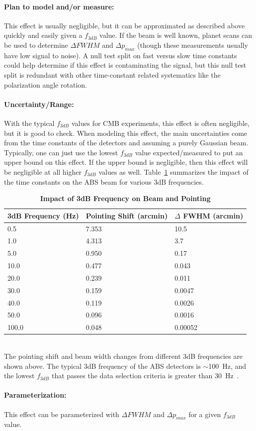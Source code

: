 \paragraph{Plan to model and/or measure:}

This effect is usually negligible, but it can be approximated as described above quickly and easily given a $f_{3dB}$ value. If the beam is well known, planet scans can be used to determine $\Delta FWHM$ and $\Delta p_{max}$ (though these measurements usually have low signal to noise). A null test split on fast versus slow time constants could help determine if this effect is contaminating the signal, but this null test split is redundant with other time-constant related systematics like the polarization angle rotation.

\paragraph{Uncertainty/Range:}
With the typical $f_{3dB}$ values for CMB experiments, this effect is often negligible, but it is good to check. When modeling this effect, the main uncertainties come from the time constants of the detectors and assuming a purely Gaussian beam. Typically, one can just use the lowest $f_{3dB}$ value expected/measured to put an upper bound on this effect. If the upper bound is negligible, then this effect will be negligible at all higher $f_{3dB}$ values as well. Table~\ref{table:tc_shift} summarizes the impact of the time constants on the ABS beam for various 3dB frequencies.

\begin{table}[h!] 
\begin{center}
  \caption {\textbf{Impact of 3dB Frequency on Beam and Pointing}}\label{table:tc_shift}
\begin{tabular}{|l|l|l|}
  \hline                        
  \textbf{3dB Frequency (Hz)} &  \textbf{Pointing Shift (arcmin)} &  \textbf{$\Delta$ FWHM (arcmin)} \\
  \hline
  0.5 & 7.353 & 10.5 \\
  \hline
  1.0 & 4.313 & 3.7 \\
  \hline
  5.0 & 0.950 & 0.17 \\
 \hline  
  10.0 & 0.477 & 0.043 \\
 \hline  
  20.0 & 0.239 & 0.011 \\
 \hline  
  30.0 & 0.159 & 0.0047 \\
 \hline  
  40.0 & 0.119 & 0.0026 \\
 \hline  
  50.0 & 0.096 & 0.0016 \\
 \hline  
  100.0 & 0.048 & 0.00052 \\
 \hline  
\end{tabular}\\
The pointing shift and beam width changes from different 3dB frequencies are shown above. The typical 3dB frequency of the ABS detectors is $\sim$100~Hz, and the lowest $f_{3dB}$ that passes the data selection criteria is greater than 30~Hz~\cite{Simon_Thesis_2016}.
\end{center}
\end{table}

\paragraph{Parameterization:}
This effect can be parameterized with $\Delta FWHM$ and $\Delta p_{max}$ for a given $f_{3dB}$ value.
